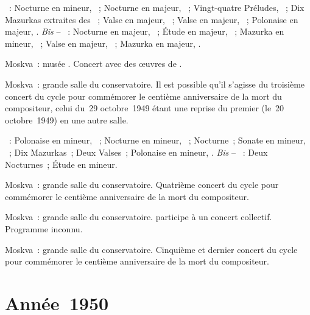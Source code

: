 \begin{description}
 \textsc{\Chopin{}}~: Nocturne en \kC mineur,  ~;
 Nocturne en \kG majeur,  ~; Vingt-quatre Préludes,
 ~; Dix Mazurkas extraites des ~; Valse en \kA \Flat majeur, ~; Valse en \kD \Flat majeur,
  ~; Polonaise en \kA \Flat majeur, .
 \emph{Bis} -- \textsc{\Chopin{}}~: Nocturne en \kE \Flat majeur, 
 ~; Étude en \kF majeur,  ~; Mazurka en \kA
 mineur,  ~; Valse  en \kA \Flat majeur,
  ~; Mazurka en \kD majeur,  .
 \item[\DateWithWeekDay{1949-11-27}]
 Moskva~: musée \Scriabine{}.
 Concert avec des œuvres de \Chopin{}.
 \item[\DateWithWeekDay{1949-12-12}]
 Moskva~: grande salle du conservatoire.
 Il est possible qu'il s'agisse du troisième concert du cycle \Chopin{} pour
 commémorer le centième anniversaire de la mort du compositeur, celui du~29
 octobre~1949 étant une reprise du premier (le~20 octobre~1949) en une autre
 salle.

 \textsc{\Chopin{}}~: Polonaise en \kC \Sharp mineur,  ~;
 Nocturne en \kC \Sharp mineur,  ~; Nocturne~; Sonate en
 \kB mineur, ~; Dix Mazurkas~; Deux Valses~; Polonaise en \kF
 \Sharp mineur, .
 \emph{Bis} -- \textsc{\Chopin{}}~: Deux Nocturnes~; Étude en \kC \Sharp
 mineur.
 \item[\DateWithWeekDay{1949-12-19}]
 Moskva~: grande salle du conservatoire.
 Quatrième concert du cycle \Chopin{} pour commémorer le centième
 anniversaire de la mort du compositeur.
 \item[\DateWithWeekDay{1949-12-21}]
 Moskva~: grande salle du conservatoire.
 \VSofronitsky{} participe à un concert collectif.
 Programme inconnu.
 \item[\DateWithWeekDay{1949-12-24}]
 Moskva~: grande salle du conservatoire.
 Cinquième et dernier concert du cycle \Chopin{} pour commémorer le centième
 anniversaire de la mort du compositeur.
\end{description}

\section{Année~1950}

